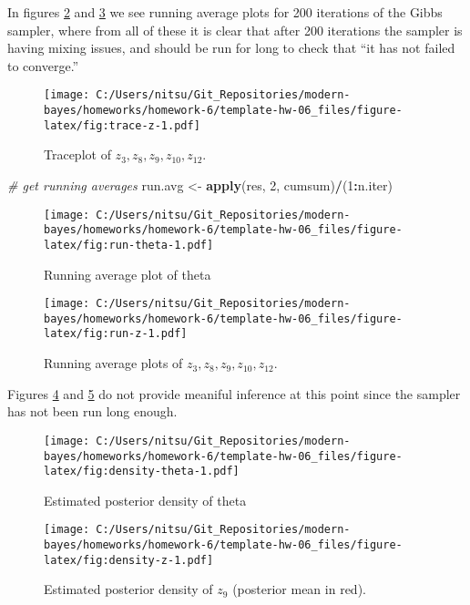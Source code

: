 \documentclass[
]{article}
\newenvironment{Shaded}{\begin{snugshade}}{\end{snugshade}}
\newcommand{\CommentTok}[1]{\textcolor[rgb]{0.56,0.35,0.01}{\textit{#1}}}
\newcommand{\DecValTok}[1]{\textcolor[rgb]{0.00,0.00,0.81}{#1}}
\newcommand{\KeywordTok}[1]{\textcolor[rgb]{0.13,0.29,0.53}{\textbf{#1}}}
\newcommand{\NormalTok}[1]{#1}
\newcommand{\OperatorTok}[1]{\textcolor[rgb]{0.81,0.36,0.00}{\textbf{#1}}}
\newcommand{\StringTok}[1]{\textcolor[rgb]{0.31,0.60,0.02}{#1}}
\begin{document}
In figures \ref{fig:run-theta} and \ref{fig:run-z} we see running
average plots for 200 iterations of the Gibbs sampler, where from all of
these it is clear that after 200 iterations the sampler is having mixing
issues, and should be run for long to check that ``it has not failed to
converge.''

\begin{figure}
\centering
\texttt{[image: C:/Users/nitsu/Git\_Repositories/modern-bayes/homeworks/homework-6/template-hw-06\_files/figure-latex/fig:trace-z-1.pdf]}
\caption{\label{fig:trace-z}Traceplot of
\(z_3, z_8, z_9, z_{10}, z_{12}.\)}
\end{figure}

\begin{Shaded}
\begin{Highlighting}[]
\CommentTok{\# get running averages}
\NormalTok{run.avg \textless{}{-}}\StringTok{ }\KeywordTok{apply}\NormalTok{(res, }\DecValTok{2}\NormalTok{, cumsum)}\OperatorTok{/}\NormalTok{(}\DecValTok{1}\OperatorTok{:}\NormalTok{n.iter)}
\end{Highlighting}
\end{Shaded}

\begin{figure}
\centering
\texttt{[image: C:/Users/nitsu/Git\_Repositories/modern-bayes/homeworks/homework-6/template-hw-06\_files/figure-latex/fig:run-theta-1.pdf]}
\caption{\label{fig:run-theta}Running average plot of theta}
\end{figure}

\begin{figure}
\centering
\texttt{[image: C:/Users/nitsu/Git\_Repositories/modern-bayes/homeworks/homework-6/template-hw-06\_files/figure-latex/fig:run-z-1.pdf]}
\caption{\label{fig:run-z}Running average plots of
\(z_3, z_8, z_9, z_{10}, z_{12}.\)}
\end{figure}

Figures \ref{fig:density-theta} and \ref{fig:density-z} do not provide
meaniful inference at this point since the sampler has not been run long
enough.

\begin{figure}
\centering
\texttt{[image: C:/Users/nitsu/Git\_Repositories/modern-bayes/homeworks/homework-6/template-hw-06\_files/figure-latex/fig:density-theta-1.pdf]}
\caption{\label{fig:density-theta}Estimated posterior density of theta}
\end{figure}

\begin{figure}
\centering
\texttt{[image: C:/Users/nitsu/Git\_Repositories/modern-bayes/homeworks/homework-6/template-hw-06\_files/figure-latex/fig:density-z-1.pdf]}
\caption{\label{fig:density-z}Estimated posterior density of \(z_9\)
(posterior mean in red).}
\end{figure}
\end{document}
